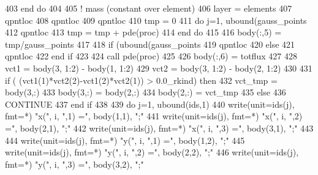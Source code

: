 \begin{DoxyCode}
403 \textcolor{keywordflow}{      end do}
404     
405       \textcolor{comment}{! mass (constant over element)}
406       layer = elements%
407       qpntloc%
408       qpntloc%
409       qpntloc%
410       tmp = 0
411       \textcolor{keywordflow}{do} j=1, ubound(gauss_points%
412         qpntloc%
413         tmp = tmp + pde(proc)%
414 \textcolor{keywordflow}{      end do}
415       
416       body(:,5) = tmp/gauss_points%
417         
418       \textcolor{keywordflow}{if} (ubound(gauss_points%
419         qpntloc%
420       \textcolor{keywordflow}{else}
421         qpntloc%
422 \textcolor{keywordflow}{      end if}
423       
424       \textcolor{keyword}{call }pde(proc)%
425 
426       body(:,6) = totflux
427       
428       vct1 = body(3, 1:2) - body(1, 1:2) 
429       vct2 = body(3, 1:2) - body(2, 1:2)
430       
431       \textcolor{keywordflow}{if} ( (vct1(1)*vct2(2)-vct1(2)*vct2(1)) > 0.0\_rkind) \textcolor{keywordflow}{then}
432         vct\_tmp = body(3,:)
433         body(3,:) = body(2,:)
434         body(2,:) = vct\_tmp
435       \textcolor{keywordflow}{else}
436         \textcolor{keywordflow}{CONTINUE}
437 \textcolor{keywordflow}{      end if}
438 
439       \textcolor{keywordflow}{do} j=1, ubound(ids,1)
440         \textcolor{keyword}{write}(unit=ids(j), fmt=*) \textcolor{stringliteral}{"x("}, i, \textcolor{stringliteral}{",1) ="}, body(1,1), \textcolor{stringliteral}{";"}
441         \textcolor{keyword}{write}(unit=ids(j), fmt=*) \textcolor{stringliteral}{"x("}, i, \textcolor{stringliteral}{",2) ="}, body(2,1), \textcolor{stringliteral}{";"}
442         \textcolor{keyword}{write}(unit=ids(j), fmt=*) \textcolor{stringliteral}{"x("}, i, \textcolor{stringliteral}{",3) ="}, body(3,1), \textcolor{stringliteral}{";"}
443         
444         \textcolor{keyword}{write}(unit=ids(j), fmt=*) \textcolor{stringliteral}{"y("}, i, \textcolor{stringliteral}{",1) ="}, body(1,2), \textcolor{stringliteral}{";"}
445         \textcolor{keyword}{write}(unit=ids(j), fmt=*) \textcolor{stringliteral}{"y("}, i, \textcolor{stringliteral}{",2) ="}, body(2,2), \textcolor{stringliteral}{";"}
446         \textcolor{keyword}{write}(unit=ids(j), fmt=*) \textcolor{stringliteral}{"y("}, i, \textcolor{stringliteral}{",3) ="}, body(3,2), \textcolor{stringliteral}{";"}

\end{DoxyCode}
